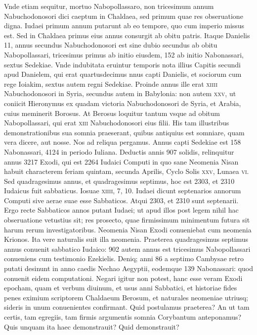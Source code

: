 \begin{parnumbers}
{}
Vnde etiam sequitur, mortuo Nabopollassaro, non tricesimum annum Nabuchodonosori
dici caeptum in Chaldaea, sed primum quae res obseruatione
digna.
\lnr{}Iudaei primum annum putarunt ab eo tempore, quo
cum imperio missus est. Sed in Chaldaea primus eius annus consurgit
ab obitu patris.
\lnr{}Itaque Danielis 11, annus secundus Nabuchodonosori
est sine dubio secundus ab obitu Nabopollassari, tricesimus
primus ab initio eiusdem, 152 ab initio Nabonassari, sextus
Sedekiae.
\lnr{}Vnde indubitata eruintur temporis nota illius Capitis secundi
apud Danielem, qui erat quartusdecimus nnus capti Danielis,
et sociorum cum rege Ioiakim, sextus autem regni Sedekiae.
\lnr{}Proinde annus ille erat \textsc{xiiii} Nabuchodonosori in Syria, secundus
autem in Babylonia: non autem \textsc{xxv}, ut coniicit Hieronymus
ex quadam victoria Nabuchodonosori de Syria, et Arabia, cuius
meminerit Borosus.
\lnr{}At Berosus loquitur tantum vsque ad obitum
Nabopollassari, qui erat \textsc{xiii} Nabuchodonosori eius filii.
\lnr{}His tam illustribus demonstrationibus sua somnia praeserant, quibus antiquius
est somniare, quam vera dicere, aut nosse.
\lnr{}Nos ad reliqua
pergamus.
\lnr{}Annus capti Sedekiae est 158 Nabonassari, 4124 in periodo Iuliana.
\lnr{}Deductis annis 907 solidis, relinquitur annus 3217
Exodi, qui est 2264 Iudaici Computi in quo sane Neomenia Nisan
habuit characterem feriam quintam, secunda Aprilis, Cyclo
Solis \textsc{xxv}, Lunaea \textsc{vi}.
\lnr{}Sed quadragesimus annus, et quadragesimus
septimus, hoc est 2303, et 2310 Iudaicus fuit sabbaticus.
\lnr{}Iosuae
\textsc{xiiii}, 7, 10.
\lnr{}Iudaei dicunt septenarios annorum Computi sive aerae
suae esse Sabbaticos.
\lnr{}Atqui 2303, et 2310 sunt septenarii.
\lnr{}Ergo recte
Sabbaticos annos putant Iudaei; ut apud illos post legem nihil
hac obseruatione vetustius sit; res prosecto, quae firmissimum
minimentum futura sit harum rerum investigatoribus.
\lnr{}Neomenia Nisan Exodi conueniebat cum neomenia Krionos.
\lnr{}Ita vere naturalis suit illa neomenia.
\lnr{}Praeterea quadragesimus septimus
annus conuenit sabbatico Iudaico: 902 autem annus est tricesimus
Nabopollassari conueniens cum testimonio Ezekielis.
\lnr{}Deniq; anni 86 a septimo Cambysae retro putati desinunt in anno
caedis Nechao Aegyptii, eodemque 139 Nabonassari: quod conuenit
eidem computationi.
\lnr{}Negari igitur non potest, hanc esse veram
Exodi epocham, quam et verbum diuinum, et usus anni Sabbatici,
et historiae fides penes eximium scriptorem Chaldaeum
Berosum, et naturales neomeniae utriusq; sideris in unum conuenientes
confirmant.
\lnr{}Quid postulamus praeterea?
\lnr{}An ut tam certis,
tam egregiis, tam firmis argumentis somnia Corybantum anteponamus?
\lnr{}Quis unquam ita haec demonstrauit?
\lnr{}Quid demonstrauit?


\end{parnumbers}
